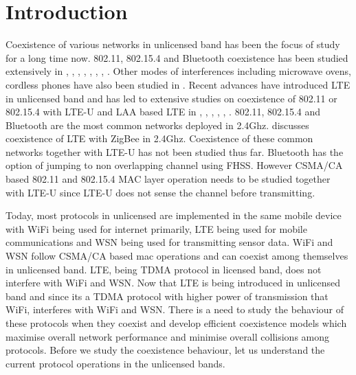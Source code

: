\documentclass[a4paper]{article}
\begin{document}
	\section{Introduction}
	Coexistence of various networks in unlicensed band has been the focus of study for a long time now. 802.11, 802.15.4 and Bluetooth coexistence has been studied extensively in \cite{953230}, \cite{4024941}, \cite{1666534}, \cite{7793984}, \cite{6425289}, \cite{4436237}, \cite{Tytgat2012}, \cite{6645003}. Other modes of interferences including microwave ovens, cordless phones have also been studied in \cite{5210929}. Recent advances have introduced {LTE} in unlicensed band and has led to extensive studies on coexistence of 802.11 or 802.15.4 with {LTE-U} and {LAA based LTE} in \cite{7564872}, \cite{7497766}, \cite{7419263}, \cite{7583669}, \cite{7063521}, \cite{7506714}.  802.11, 802.15.4 and {Bluetooth} are the most common networks deployed in {2.4Ghz}. \cite{7506714} discusses coexistence of {LTE} with {ZigBee} in {2.4Ghz}. Coexistence of these common networks together with {LTE-U} has not been studied thus far. {Bluetooth} has the option of jumping to non overlapping channel using {FHSS}. However {CSMA/CA} based 802.11 and 802.15.4 {MAC} layer operation needs to be studied together with {LTE-U} since {LTE-U} does not sense the channel before transmitting.\par
	Today, most protocols in unlicensed are implemented in the same mobile device with {WiFi} being used for internet primarily, {LTE} being used for mobile communications and {WSN} being used for transmitting sensor data. {WiFi} and {WSN} follow CSMA/CA based mac operations and can coexist among themselves in unlicensed band. {LTE}, being TDMA protocol in licensed band, does not interfere with {WiFi} and {WSN}. Now that {LTE} is being introduced in unlicensed band and since its a TDMA protocol with higher power of transmission that {WiFi}, interferes with {WiFi} and {WSN}. There is a need to study the behaviour of these protocols when they coexist and develop efficient coexistence models which maximise overall network performance and minimise overall collisions among protocols. Before we study the coexistence behaviour, let us understand the current protocol operations in the unlicensed bands.
\end{document}
